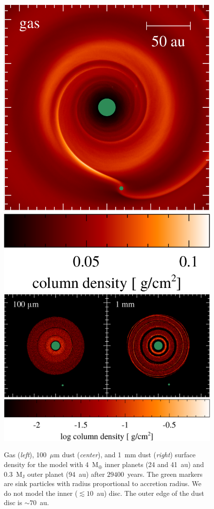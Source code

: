 \documentclass[usenatbib,a4paper,times]{mnras}
\renewcommand{\earth}{\mathrm{M}_{\oplus}}
\begin{document}
\begin{figure}
   \begin{center}
      \includegraphics[height=0.460\columnwidth]{figs/gas.pdf}
      \includegraphics[height=0.460\columnwidth]{figs/dust.pdf}
      \caption{Gas (\textit{left}), 100~$\mu$m dust (\textit{center}), and 1~mm
         dust (\textit{right}) surface density for the model with 4~$\earth{}$
         inner planets (24 and 41~au) and 0.3~$\mathrm{M_J}$ outer planet
         (94~au) after $29400$~years. The green markers are sink particles with
         radius proportional to accretion radius. We do not model the inner
         ($\lesssim 10$~au) disc. The outer edge of the dust disc is $\sim
         70$~au.\label{fig:surface-density}}
   \end{center}
\end{figure}
\end{document}
